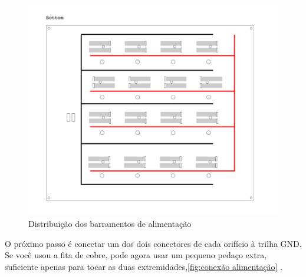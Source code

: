 \documentclass[paper=a4, fontsize=11pt]{scrartcl} %
\numberwithin{equation}{section} %
\numberwithin{figure}{section} %
\numberwithin{table}{section} %
\begin{document}
 \begin{figure}[H] %
  \centering
  \includegraphics[scale=0.15]{./imagens/board-3.jpg}
  \caption[ ]{Distribuição dos barramentos de alimentação}
  \label{fig:alimentação}
  \end{figure}
  
  O próximo passo é conectar um dos dois conectores de cada orifício à trilha GND. Se você usou a fita de cobre, pode agora usar um pequeno pedaço extra, suficiente apenas para tocar as duas extremidades,\ref{fig:conexão alimentação} .
 
\end{document}
